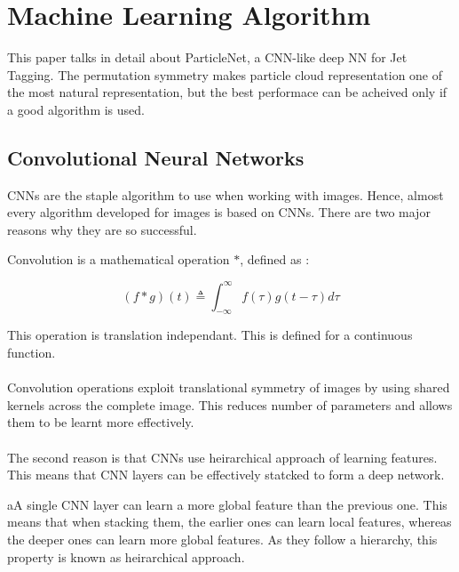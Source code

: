 \section{Machine Learning Algorithm}
This paper talks in detail about ParticleNet, a CNN-like deep NN for Jet Tagging. 
The permutation symmetry makes particle cloud representation one of the most 
natural representation, but the best performace can be acheived only if a 
good algorithm is used.

\subsection{Convolutional Neural Networks}
CNNs are the staple algorithm to use when working with images. Hence, almost 
every algorithm developed for images is based on CNNs. There are two major reasons 
why they are so successful.

\begin{definition}
    Convolution is a mathematical operation $*$, defined as :

    \begin{equation*}
        (f*g)(t) \triangleq \int_{-\infty}^{\infty} f(\tau)g(t - \tau) d\tau
    \end{equation*}

    \noindent This operation is translation independant. This is defined for 
    a continuous function.
\end{definition}

\paragraph{} Convolution operations exploit translational symmetry of images by using shared kernels across the complete image. This reduces number of parameters and allows them to be learnt more effectively.

\paragraph{} The second reason is that CNNs use heirarchical approach of learning features. This means that CNN layers can be effectively statcked to form a deep network.

\begin{note}
    aA single CNN layer can learn a more global feature than the previous one. 
    This means that when stacking them, the earlier ones can learn local 
    features, whereas the deeper ones can learn more global features. As they 
    follow a hierarchy, this property is known as heirarchical approach.
\end{note}

